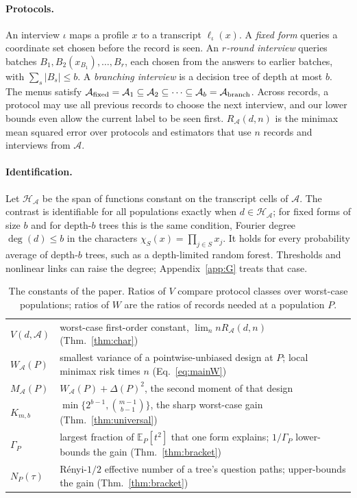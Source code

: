 \documentclass{article}
\newcommand{\E}{\mathbb{E}}
\newcommand{\A}{\mathcal A}
\newcommand{\Hh}{\mathcal H}
\begin{document}
\paragraph{Protocols.}
An interview $\iota$ maps a profile $x$ to a transcript $\ell_\iota(x)$. A \emph{fixed form} queries a coordinate set chosen before the record is seen. An \emph{$r$-round interview} queries batches $B_1,B_2(x_{B_1}),\ldots,B_r$, each chosen from the answers to earlier batches, with $\sum_s|B_s|\le b$. A \emph{branching interview} is a decision tree of depth at most $b$. The menus satisfy $\A_{\rm fixed}=\A_1\subseteq\A_2\subseteq\cdots\subseteq\A_b=\A_{\rm branch}$. Across records, a protocol may use all previous records to choose the next interview, and our lower bounds even allow the current label to be seen first. $R_\A(d,n)$ is the minimax mean squared error over protocols and estimators that use $n$ records and interviews from $\A$.

\paragraph{Identification.}
Let $\Hh_\A$ be the span of functions constant on the transcript cells of $\A$. The contrast is identifiable for all populations exactly when $d\in\Hh_\A$; for fixed forms of size $b$ and for depth-$b$ trees this is the same condition, Fourier degree $\deg(d)\le b$ in the characters $\chi_S(x)=\prod_{j\in S}x_j$. It holds for every probability average of depth-$b$ trees, such as a depth-limited random forest. Thresholds and nonlinear links can raise the degree; Appendix~\ref{app:G} treats that case.

\begin{table}[t]
\centering
\caption{The constants of the paper. Ratios of $V$ compare protocol classes over worst-case populations; ratios of $W$ are the ratios of records needed at a population $P$.}
\label{tab:constants}
\footnotesize
\setlength{\tabcolsep}{2.5pt}
\begin{tabular}{lp{6.3cm}}
\toprule
$V(d,\A)$ & worst-case first-order constant, $\lim_n nR_\A(d,n)$ (Thm.~\ref{thm:char})\\
$W_\A(P)$ & smallest variance of a pointwise-unbiased design at $P$; local minimax risk times $n$ (Eq.~\ref{eq:mainW})\\
$M_\A(P)$ & $W_\A(P)+\Delta(P)^2$, the second moment of that design\\
$K_{m,b}$ & $\min\{2^{b-1},\binom{m-1}{b-1}\}$, the sharp worst-case gain (Thm.~\ref{thm:universal})\\
$\Gamma_P$ & largest fraction of $\E_P[t^2]$ that one form explains; $1/\Gamma_P$ lower-bounds the gain (Thm.~\ref{thm:bracket})\\
$N_P(\tau)$ & R\'enyi-$1/2$ effective number of a tree's question paths; upper-bounds the gain (Thm.~\ref{thm:bracket})\\
\bottomrule
\end{tabular}
\end{table}
\end{document}
